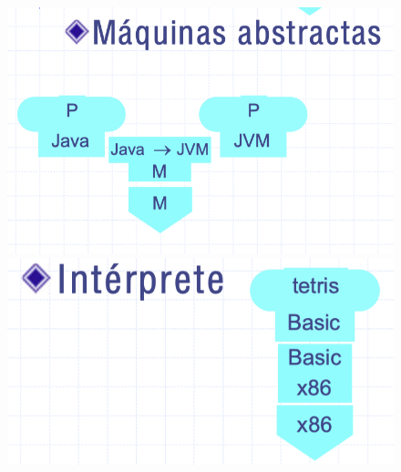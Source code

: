 \documentclass[12pt, twoside, openright]{report} %
\begin{document}
\begin{figure}[H]
	{\includegraphics[scale=.2]{Untitled 20.png}
	\includegraphics[scale=.2]{Untitled 21.png}}
\end{figure}
\end{document}
